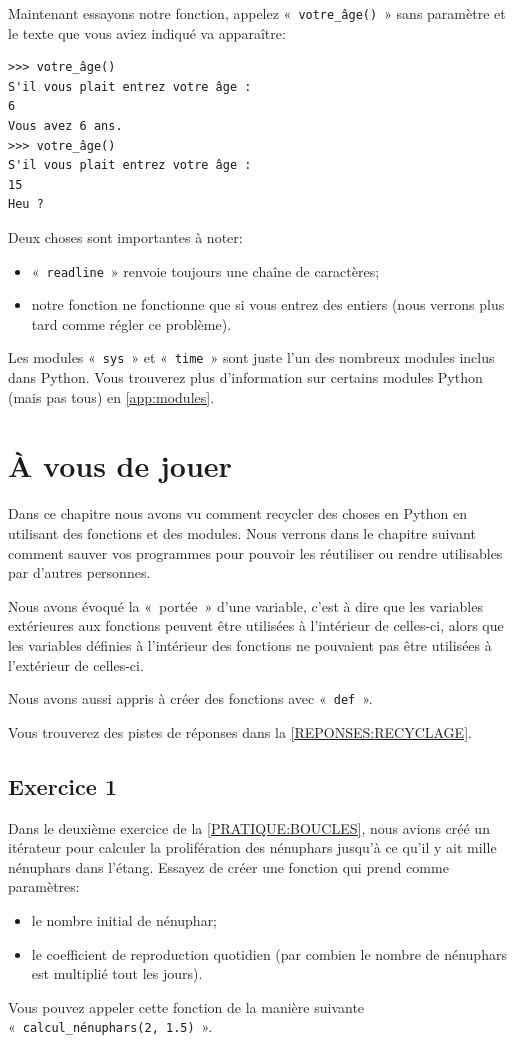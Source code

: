 Maintenant essayons notre fonction, appelez  «~\texttt{votre\_âge()}~» sans paramètre et le texte que vous aviez indiqué va apparaître:

\begin{Verbatim}[frame=single,rulecolor=\color{mbleu}, label=à taper]
>>> votre_âge()
S'il vous plait entrez votre âge :
6
Vous avez 6 ans.
>>> votre_âge()
S'il vous plait entrez votre âge :
15
Heu ?
\end{Verbatim}

Deux choses sont importantes à noter:
\begin{itemize}
\item «~\texttt{readline}~» renvoie toujours une chaîne de caractères;
\item notre fonction ne fonctionne que si vous entrez des entiers (nous verrons plus tard comme régler ce problème).
\end{itemize}

Les modules «~\texttt{sys}~»  et «~\texttt{time}~»  sont juste l'un des nombreux modules inclus dans Python. Vous trouverez plus d'information sur certains modules Python (mais pas tous) en \autoref{app:modules}.

\section{À vous de jouer\label{PRATIQUE:RECYCLAGE}}
Dans ce chapitre nous avons vu comment recycler des choses en Python en utilisant des fonctions et des modules.
Nous verrons dans le chapitre suivant comment sauver vos programmes pour pouvoir les réutiliser ou rendre utilisables par d'autres personnes.

Nous avons évoqué la «~portée~» d'une variable, c'est à dire que les variables extérieures aux fonctions peuvent être utilisées à l'intérieur de celles-ci, alors que les variables définies à l'intérieur des fonctions ne pouvaient pas être utilisées à l'extérieur de celles-ci.

Nous avons aussi appris à créer des fonctions avec «~\texttt{def}~».

Vous trouverez des pistes de réponses dans la \autoref{REPONSES:RECYCLAGE}.


\subsection{Exercice 1}
Dans le deuxième exercice de la \autoref{PRATIQUE:BOUCLES}, nous avions créé un itérateur pour calculer la prolifération des nénuphars jusqu'à ce qu'il y ait mille nénuphars dans l'étang.
Essayez de créer une fonction qui prend comme paramètres:
\begin{itemize}
\item le nombre initial de nénuphar;
\item le coefficient de reproduction quotidien (par combien le nombre de nénuphars est multiplié tout les jours).
\end{itemize}
Vous pouvez appeler cette fonction de la manière suivante «~\texttt{calcul\_nénuphars(2, 1.5)}~».

